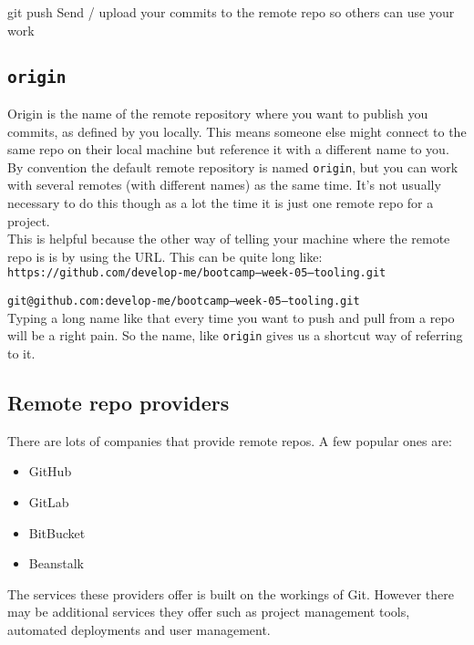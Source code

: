 \begin{infobox}{git push}
	Send / upload your commits to the remote repo so others can use your work 
\end{infobox}


\subsection{\texttt{origin}}

Origin is the name of the remote repository where you want to publish you commits, as defined by you locally. This means someone else might connect to the same repo on their local machine but reference it with a different name to you.
\\

By convention the default remote repository is named \texttt{origin}, but you can work with several remotes (with different names) as the same time. It's not usually necessary to do this though as a lot the time it is just one remote repo for a project.
\\

This is helpful because the other way of telling your machine where the remote repo is is by using the URL. This can be quite long like:
\\

\texttt{https://github.com/develop-me/bootcamp--week-05--tooling.git}

\texttt{git@github.com:develop-me/bootcamp--week-05--tooling.git}
\\

Typing a long name like that every time you want to push and pull from a repo will be a right pain. So the name, like \texttt{origin} gives us a shortcut way of referring to it.

\subsection{Remote repo providers}

There are lots of companies that provide remote repos. A few popular ones are:

\begin{itemize}
    \item GitHub
    \item GitLab
    \item BitBucket
	\item Beanstalk
\end{itemize}

The services these providers offer is built on the workings of Git. However there may be additional services they offer such as project management tools, automated deployments and user management.
\\

